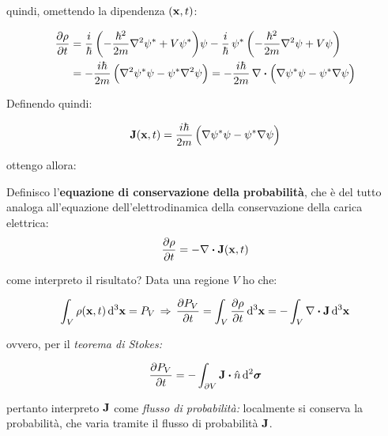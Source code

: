 	quindi, omettendo la dipendenza $\qty(\vb{x}, t)$:
	
\begin{align*}
	\pdv{\rho}{t} & = \frac{i}{\hbar} \, \qty(- \frac{\hbar^2}{2m} \nabla^2\psi^* + V\psi^*)\psi - \frac{i}{\hbar} \, \psi^* \, \qty(-\frac{\hbar^2}{2m} \nabla^2 \psi + V\psi) \\
	 & = - \frac{i\hbar}{2m} \, \qty\Big(\nabla^2 \psi^*\psi - \psi^* \nabla^2 \psi) = - \frac{i\hbar}{2m} \, \nabla \vdot  \qty\Big(\nabla \psi^*\psi - \psi^* \nabla \psi)  
\end{align*}

	Definendo quindi:
	
\begin{align*}
	\vb{J}(\vb{x}, t) = \frac{i\hbar}{2m} \, \qty\Big(\nabla \psi^* \psi - \psi^* \nabla \psi)
\end{align*}

	ottengo allora:
	
\begin{mydef}
	Definisco l'\textbf{equazione di conservazione della probabilità}, che è del tutto analoga all'equazione dell'elettrodinamica della conservazione della carica elettrica:
\begin{align*}
	\pdv{\rho}{t}(\vb{x}, t) = - \nabla \vdot \vb{J}(\vb{x}, t)
\end{align*}
\end{mydef}

	come interpreto il risultato? Data una regione $V$ ho che:
	
\begin{align*}
	\int_V \rho(\vb{x}, t) \, \dd^3 \vb{x} = P_V \, \Rightarrow \, \pdv{P_V}{t} = \int_V \pdv{\rho}{t} \, \dd^3 \vb{x} = - \int_V \nabla \vdot \vb{J} \, \dd^3 \vb{x}
\end{align*}

	ovvero, per il \textit{teorema di Stokes:}
	
\begin{align*}
	\pdv{P_V}{t} = - \int_{\partial V} \vb{J} \vdot \hat{n} \, \dd^2 \vb*{\sigma}
\end{align*}

	pertanto interpreto $\vb{J}$ come \textit{flusso di probabilità:} localmente si conserva la probabilità, che varia tramite il flusso di probabilità $\vb{J}$.






	